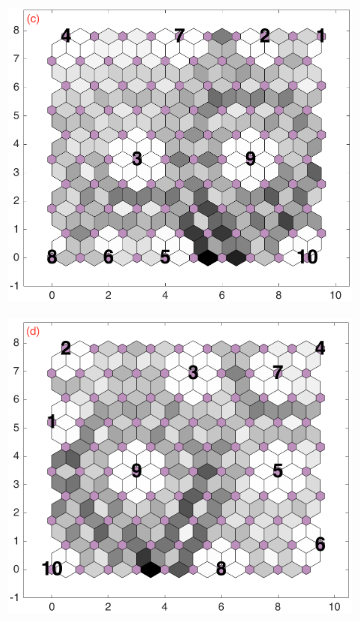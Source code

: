 \begin{figure}
\begin{subfigure}[b]{0.25\textwidth}
        \label{fig: col3and12_dist}
    \end{subfigure}
        \hfill
    \begin{subfigure}[b]{0.25\textwidth}
        \centering
        \includegraphics[width=\textwidth]{../../images0.01/M31/2D/diff_dimension/combine_2D_data_between_cols3and13.png}
        \label{fig: col3and13_dist}
    \end{subfigure}
        \hfill
    \begin{subfigure}[b]{0.25\textwidth}
        \centering
        \includegraphics[width=\textwidth]{../../images0.01/M31/2D/diff_dimension/combine_2D_data_between_cols3and14.png}

\end{subfigure}
\end{figure}
